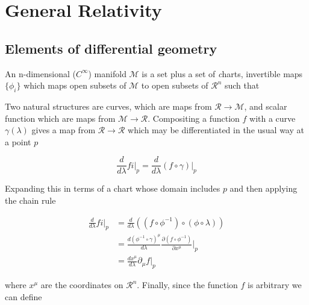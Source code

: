 
\section{General Relativity}
\subsection{Elements of differential geometry}

An n-dimensional ($C^\infty$) manifold $\mathcal{M}$ is a set plus a
set of {\emph charts}, invertible maps $\{\phi_i\}$ which maps open
subsets of $\mathcal{M}$ to open subsets of $\mathcal{R}^n$ such that

\iffalse
\begin{list}
\item For all points $p \in \mathcal{M}$ there exists an $\phi_i$ 
such that $p$ is in the domain of $\phi_i$.
\item The composition $\phi_i \circ \phi_j^{-1}$ on the 
intersections of the domains of $\phi_i$ and $\phi_j$ is a
($C^\infty$) function from $\mathcal{R}^n \to \mathcal{R}^n$.
\end{list} 
\fi

Two natural structures are curves, which are maps from
$\mathcal{R}\to\mathcal{M}$, and scalar function which are maps from
$\mathcal{M}\to\mathcal{R}$.  Compositing a function $f$ with a curve
$\gamma(\lambda)$ gives a map from $\mathcal{R} \rightarrow
\mathcal{R}$ which may be differentiated in the usual way at a point
$p$


\begin{equation*}
\frac{d}{d \lambda} fi \big|_p = 
  \frac{d}{d\lambda} (f \circ \gamma) \big|_p
\end{equation*}


Expanding this in terms of a chart whose domain includes $p$ and then
applying the chain rule
 
\begin{align*}
\frac{d}{d \lambda} fi \big|_p &= 
 \frac{d}{d\lambda} ( (f \circ \phi^{-1}) \circ (\phi \circ
\lambda) ) \\
&= \frac{d(\phi^{-1} \circ \gamma)^\mu}{d\lambda} 
\frac{\partial (f \circ \phi^{-1}) }{\partial x^\mu} \big|_p \\
&= \frac{dx^\mu}{d\lambda} \partial_\mu f \big|_p
\end{align*}

where $x^\mu$ are the coordinates on $\mathcal{R}^n$.  Finally, since
the function $f$ is arbitrary we can define

